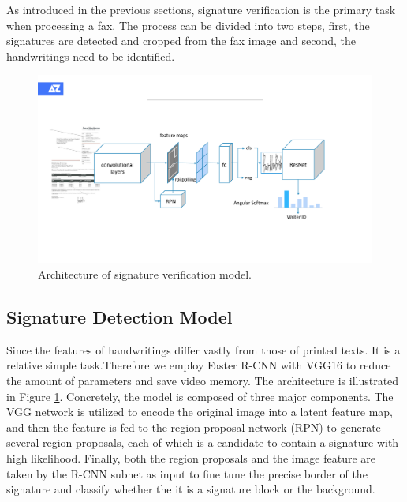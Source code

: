 \documentclass[sigconf]{acmart}
\begin{document}
As introduced in the previous sections, signature verification is the primary task when processing a fax. The process can be divided into two steps, first, the signatures are detected and cropped from the fax image and second, the handwritings need to be identified.

\begin{figure}[h]
	\centering
	\includegraphics[width=\linewidth]{figure2}
	\caption{Architecture of signature verification model. }
	\label{figure2}
\end{figure}

\subsection{Signature Detection Model}
Since the features of handwritings differ vastly from those of printed texts. It is a relative simple task.Therefore we employ Faster R-CNN \cite{ren2015faster} with VGG16 \cite{simonyan2014very} to reduce the amount of parameters and save video memory. The architecture is illustrated in Figure \ref{figure2}. Concretely, the model is composed of three major components. The VGG network is utilized to encode the original image into a latent feature map, and then the feature is fed to the region proposal network (RPN) to generate several region proposals, each of which is a candidate to contain a signature with high likelihood. Finally, both the region proposals and the image feature are taken by the R-CNN subnet as input to fine tune the precise border of the signature and classify whether the it is a signature block or the background.
\end{document}
